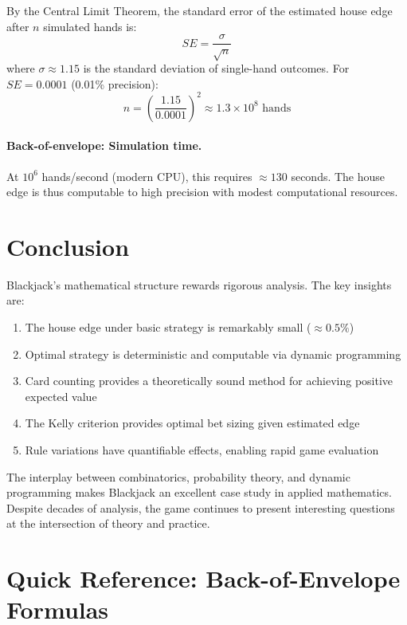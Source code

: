 \documentclass[11pt,a4paper]{article}
\theoremstyle{definition}
\begin{document}
By the Central Limit Theorem, the standard error of the estimated house edge after $n$ simulated hands is:
\begin{equation}
SE = \frac{\sigma}{\sqrt{n}}
\end{equation}
where $\sigma \approx 1.15$ is the standard deviation of single-hand outcomes. For $SE = 0.0001$ (0.01\% precision):
\[
n = \left(\frac{1.15}{0.0001}\right)^2 \approx 1.3 \times 10^8 \text{ hands}
\]

\paragraph{Back-of-envelope: Simulation time.} At $10^6$ hands/second (modern CPU), this requires $\approx 130$ seconds. The house edge is thus computable to high precision with modest computational resources.

\section{Conclusion}

Blackjack's mathematical structure rewards rigorous analysis. The key insights are:
\begin{enumerate}
\item The house edge under basic strategy is remarkably small ($\approx 0.5\%$)
\item Optimal strategy is deterministic and computable via dynamic programming
\item Card counting provides a theoretically sound method for achieving positive expected value
\item The Kelly criterion provides optimal bet sizing given estimated edge
\item Rule variations have quantifiable effects, enabling rapid game evaluation
\end{enumerate}

The interplay between combinatorics, probability theory, and dynamic programming makes Blackjack an excellent case study in applied mathematics. Despite decades of analysis, the game continues to present interesting questions at the intersection of theory and practice.

\appendix

\section{Quick Reference: Back-of-Envelope Formulas}
\end{document}
